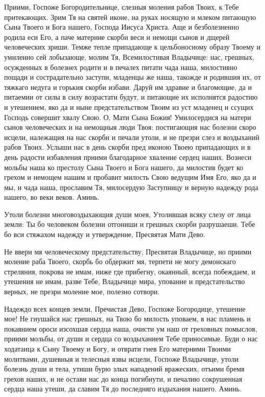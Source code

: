 Приими, Госпоже Богородительнице, слезныя моления рабов Твоих, к Тебе притекающих. Зрим Тя на святей иконе, на руках носящую и млеком питающую Сына Твоего и Бога нашего, Господа Иисуса Христа. Аще и безболезненно родила еси Его, а паче матерние скорби веси и немощи сынов и дщерей человеческих зриши. Темже тепле припадающе к цельбоносному образу Твоему и умиленно сей лобызающе, молим Тя, Всемилостивая Владычице: нас, грешных, осужденных в болезнех родити и в печалех питати чада наша, милостивно пощади и сострадательно заступи, младенцы же наша, такожде и родившия их, от тяжкаго недуга и горькия скорби избави. Даруй им здравие и благомощие, да и питаемии от силы в силу возрастати будут, и питающие их исполнятся радостию и утешением, яко да и ныне предстательством Твоим из уст младенец и ссущих Господь совершит хвалу Свою. О, Мати Сына Божия! Умилосердися на матери сынов человеческих и на немощныя люди Твоя: постигающия нас болезни скоро исцели, належащия на нас скорби и печали утоли, и не презри слез и воздыханий рабов Твоих. Услыши нас в день скорби пред иконою Твоею припадающих и в день радости избавления приими благодарное хваление сердец наших. Вознеси мольбы наша ко престолу Сына Твоего и Бога нашего, да милостив будет ко грехом и немощем нашим и пробавит милость Свою ведущим Имя Его, яко да и мы, и чада наша, прославим Тя, милосердую Заступницу и верную надежду рода нашего, во веки веков. Аминь.
\mychapterending

 




Утоли болезни многовоздыхающия души моея, Утолившая всяку слезу от лица земли: Ты бо человеком болезни отгониши и грешных скорби разрушаеши. Тебе бо вси стяжахом надежду и утверждение, Пресвятая Мати Дево.




Не ввери мя человеческому предстательству, Пресвятая Владычице, но приими моление раба Твоего, скорбь бо обдержит мя, терпети не могу демонскаго стреляния, покрова не имам, ниже где прибегну, окаянный, всегда побеждаем, и утешения не имам, разве Тебе, Владычице мира, упование и предстательство верных, не презри моление мое, полезно сотвори.




Надеждо всех концев земли, Пречистая Дево, Госпоже Богородице, утешение мое! Не гнушайся нас грешных, на Твою бо милость уповаем, в нас пламень и покаянием ороси изсохшая сердца наша, очисти ум наш от греховных помыслов, приими мольбы, от души и сердца со воздыханием Тебе приносимые. Буди о нас ходатаица к Сыну Твоему и Богу, и отврати гнев Его матерними Твоими молитвами, душевныя и телесныя язвы исцели, Госпоже Владычице, утоли болезнь души и тела, утиши бурю злых нападений вражеских, отъими бремя грехов наших, и не остави нас до конца погибнути, и печалию сокрушенная сердца наша утеши, да славим Тя до последняго издыхания нашего. Аминь.
\mychapterending

